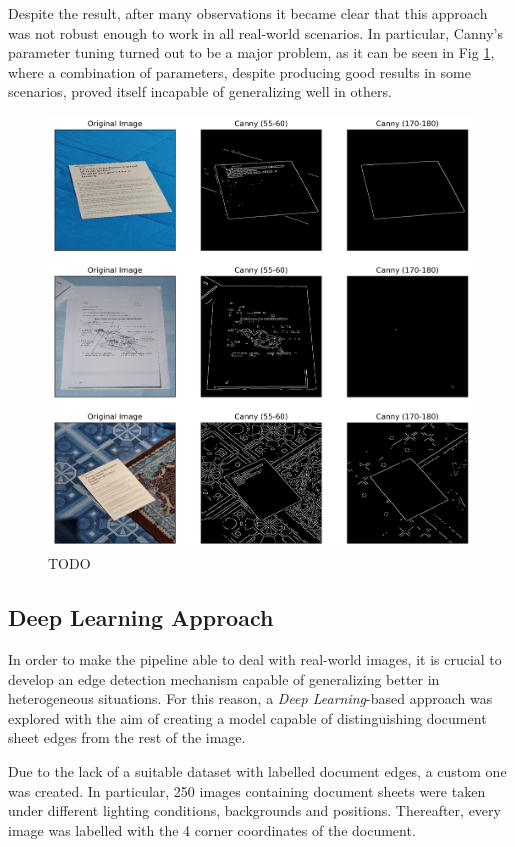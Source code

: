 \documentclass[a4paper]{article}
\begin{document}
Despite the result, after many observations it became clear that this approach was not robust enough to
work in all real-world scenarios. In particular, Canny's parameter tuning turned out to be a major
problem, as it can be seen in Fig \ref{fig:canny_comparison}, where a combination of parameters,
despite producing good results in some scenarios, proved itself incapable of generalizing well in others.

\begin{figure}[htb!]
	\includegraphics[width=\linewidth]{canny_comparison.png}
	\caption{TODO}
	\label{fig:canny_comparison}
\end{figure}

\subsection{Deep Learning Approach}

In order to make the pipeline able to deal with real-world images, it is crucial to develop an
edge detection mechanism capable of generalizing better in heterogeneous situations. 
For this reason, a \textit{Deep Learning}-based approach was explored with the aim of creating a model
capable of distinguishing document sheet edges from the rest of the image.

Due to the lack of a suitable dataset with labelled document edges, a custom one was created.
In particular, 250 images containing document sheets were taken under different lighting conditions, 
backgrounds and positions. Thereafter, every image was labelled with the 4 corner coordinates of the document.
\end{document}
